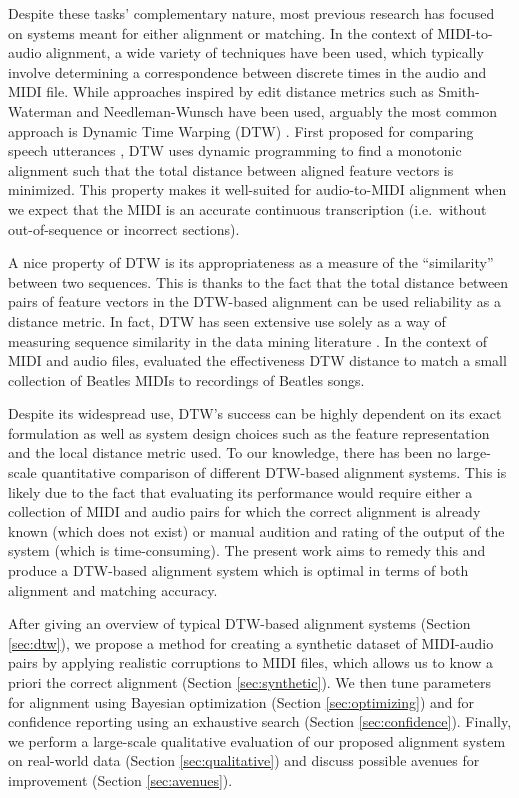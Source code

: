 \documentclass{article}
\begin{document}
Despite these tasks' complementary nature, most previous research has focused on systems meant for either alignment or matching.
In the context of MIDI-to-audio alignment, a wide variety of techniques have been used, which typically involve determining a correspondence between discrete times in the audio and MIDI file.
While approaches inspired by edit distance metrics such as Smith-Waterman \cite{ewert2012towards} and Needleman-Wunsch \cite{grachten2013automatic} have been used, arguably the most common approach is Dynamic Time Warping (DTW) \cite{muller2007dynamic}.
First proposed for comparing speech utterances \cite{sakoe1978dynamic}, DTW uses dynamic programming to find a monotonic alignment such that the total distance between aligned feature vectors is minimized.
This property makes it well-suited for audio-to-MIDI alignment when we expect that the MIDI is an accurate continuous transcription (i.e.\ without out-of-sequence or incorrect sections).

A nice property of DTW is its appropriateness as a measure of the ``similarity'' between two sequences.
This is thanks to the fact that the total distance between pairs of feature vectors in the DTW-based alignment can be used reliability as a distance metric.
In fact, DTW has seen extensive use solely as a way of measuring sequence similarity in the data mining literature \cite{berndt1994using}.
In the context of MIDI and audio files, \cite{hu2003polyphonic} evaluated the effectiveness DTW distance to match a small collection of Beatles MIDIs to recordings of Beatles songs.

Despite its widespread use, DTW's success can be highly dependent on its exact formulation as well as system design choices such as the feature representation and the local distance metric used.
To our knowledge, there has been no large-scale quantitative comparison of different DTW-based alignment systems.
This is likely due to the fact that evaluating its performance would require either a collection of MIDI and audio pairs for which the correct alignment is already known (which does not exist) or manual audition and rating of the output of the system (which is time-consuming).
The present work aims to remedy this and produce a DTW-based alignment system which is optimal in terms of both alignment and matching accuracy.

After giving an overview of typical DTW-based alignment systems (Section \ref{sec:dtw}), we propose a method for creating a synthetic dataset of MIDI-audio pairs by applying realistic corruptions to MIDI files, which allows us to know a priori the correct alignment (Section \ref{sec:synthetic}).
We then tune parameters for alignment using Bayesian optimization (Section \ref{sec:optimizing}) and for confidence reporting using an exhaustive search (Section \ref{sec:confidence}).
Finally, we perform a large-scale qualitative evaluation of our proposed alignment system on real-world data (Section \ref{sec:qualitative}) and discuss possible avenues for improvement (Section \ref{sec:avenues}).
\end{document}
